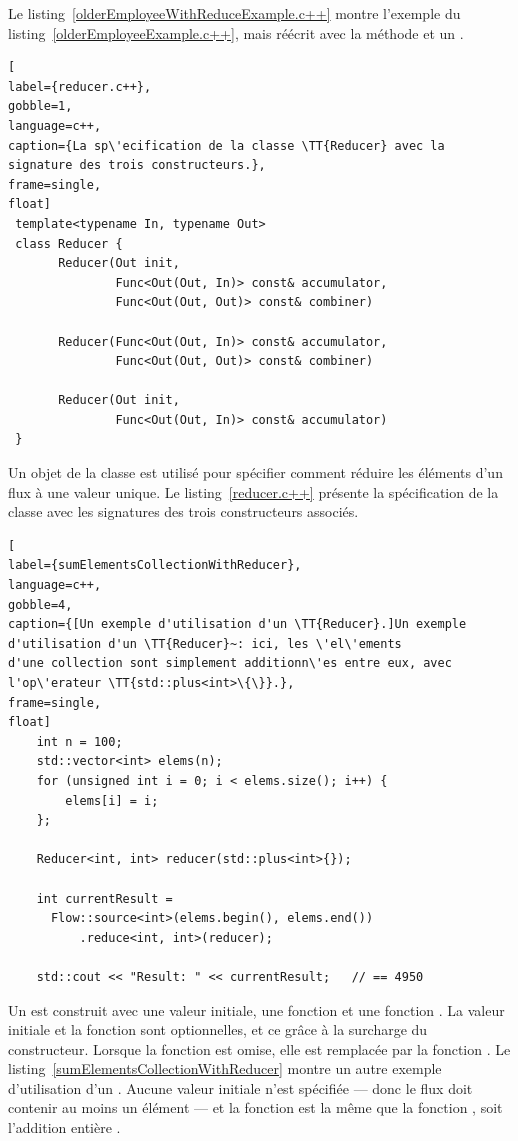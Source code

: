 Le listing~\ref{olderEmployeeWithReduceExample.c++} montre l'exemple du listing~\ref{olderEmployeeExample.c++}, mais r\'e\'ecrit avec la m\'ethode  et un .


\begin{lstlisting}[
label={reducer.c++},
gobble=1,
language=c++,
caption={La sp\'ecification de la classe \TT{Reducer} avec la signature des trois constructeurs.},
frame=single,
float]
 template<typename In, typename Out>
 class Reducer {
       Reducer(Out init, 
               Func<Out(Out, In)> const& accumulator,
               Func<Out(Out, Out)> const& combiner)

       Reducer(Func<Out(Out, In)> const& accumulator,
               Func<Out(Out, Out)> const& combiner)

       Reducer(Out init, 
               Func<Out(Out, In)> const& accumulator)
 }
\end{lstlisting}


Un objet de la classe  est utilis\'e pour sp\'ecifier comment r\'eduire les \'el\'ements d'un flux \`a une valeur unique. Le listing~\ref{reducer.c++} présente la spécification  de la classe  avec les signatures des trois constructeurs associ\'es. 


\begin{lstlisting}[
label={sumElementsCollectionWithReducer},
language=c++,
gobble=4,
caption={[Un exemple d'utilisation d'un \TT{Reducer}.]Un exemple
d'utilisation d'un \TT{Reducer}~: ici, les \'el\'ements
d'une collection sont simplement additionn\'es entre eux, avec
l'op\'erateur \TT{std::plus<int>\{\}}.},
frame=single,
float]
    int n = 100;
    std::vector<int> elems(n);
    for (unsigned int i = 0; i < elems.size(); i++) {
        elems[i] = i;
    };

    Reducer<int, int> reducer(std::plus<int>{});

    int currentResult =
      Flow::source<int>(elems.begin(), elems.end())
          .reduce<int, int>(reducer);

	std::cout << "Result: " << currentResult;	// == 4950   
\end{lstlisting}


Un  est construit avec une valeur initiale, une fonction  et une fonction . La valeur initiale et la fonction  sont optionnelles, et ce gr\^ace \`a la surcharge du constructeur. Lorsque la fonction  est omise, elle est remplac\'ee par la fonction . Le listing~\ref{sumElementsCollectionWithReducer} montre un autre exemple d'utilisation d'un . Aucune valeur initiale n'est sp\'ecifi\'ee --- donc le flux doit contenir au moins un \'el\'ement --- et la fonction  est la m\^eme que la fonction , soit l'addition enti\`ere . 


